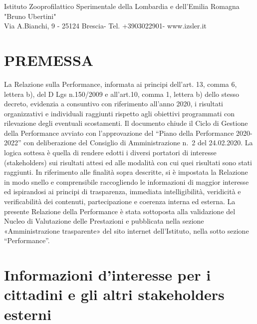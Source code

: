 \documentclass[
  12pt,
]{article}
\begin{document}
\begin{center}
  \small
   Istituto Zooprofilattico Sperimentale della Lombardia e dell'Emilia Romagna "Bruno Ubertini"\\
   Via A.Bianchi, 9 - 25124 Brescia- Tel. +3903022901- www.izsler.it
  \end{center}

\newpage
\tableofcontents

\newpage

\hypertarget{premessa}{%
\section*{PREMESSA}\label{premessa}}

La Relazione sulla Performance, informata ai principi dell'art. 13,
comma 6, lettera b), del D Lgs n.150/2009 e all'art.10, comma 1, lettera
b) dello stesso decreto, evidenzia a consuntivo con riferimento all'anno
2020, i risultati organizzativi e individuali raggiunti rispetto agli
obiettivi programmati con rilevazione degli eventuali scostamenti. Il
documento chiude il Ciclo di Gestione della Performance avviato con
l'approvazione del ``Piano della Performance 2020-2022'' con
deliberazione del Consiglio di Amministrazione n.~2 del 24.02.2020. La
logica sottesa è quella di rendere edotti i diversi portatori di
interesse (stakeholders) sui risultati attesi ed alle modalità con cui
quei risultati sono stati raggiunti. In riferimento alle finalità sopra
descritte, si è impostata la Relazione in modo snello e comprensibile
raccogliendo le informazioni di maggior interesse ed ispirandosi ai
principi di trasparenza, immediata intelligibilità, veridicità e
verificabilità dei contenuti, partecipazione e coerenza interna ed
esterna. La presente Relazione della Performance è stata sottoposta alla
validazione del Nucleo di Valutazione delle Prestazioni e pubblicata
nella sezione «Amministrazione trasparente» del sito internet
dell'Istituto, nella sotto sezione ``Performance''.

\newpage

\hypertarget{informazioni-dinteresse-per-i-cittadini-e-gli-altri-stakeholders-esterni}{%
\section{Informazioni d'interesse per i cittadini e gli altri
stakeholders
esterni}\label{informazioni-dinteresse-per-i-cittadini-e-gli-altri-stakeholders-esterni}}
\end{document}
